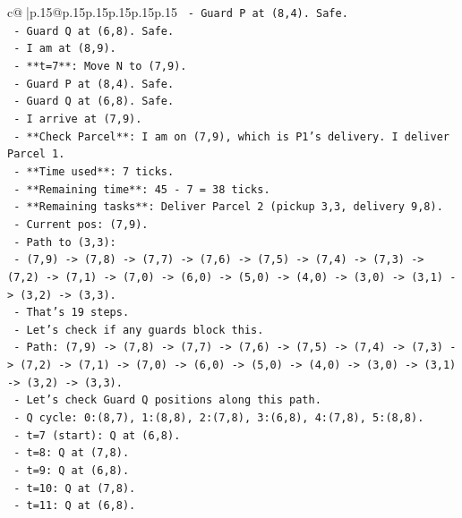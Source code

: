 \documentclass{article}
\begin{document}
{\begin{supertabular}{c@{$\;$}|p{.15\linewidth}@{}p{.15\linewidth}p{.15\linewidth}p{.15\linewidth}p{.15\linewidth}p{.15\linewidth}}
{{{\texttt{        {-}   Guard P at (8,4). Safe.} \\
\texttt{        {-}   Guard Q at (6,8). Safe.} \\
\texttt{        {-}   I am at (8,9).} \\
\texttt{    {-}   **t=7**: Move N to (7,9).} \\
\texttt{        {-}   Guard P at (8,4). Safe.} \\
\texttt{        {-}   Guard Q at (6,8). Safe.} \\
\texttt{        {-}   I arrive at (7,9).} \\
\texttt{        {-}   **Check Parcel**: I am on (7,9), which is P1's delivery. I deliver Parcel 1.} \\
\texttt{        {-}   **Time used**: 7 ticks.} \\
\texttt{        {-}   **Remaining time**: 45 {-} 7 = 38 ticks.} \\
\texttt{        {-}   **Remaining tasks**: Deliver Parcel 2 (pickup 3,3, delivery 9,8).} \\
\texttt{        {-}   Current pos: (7,9).} \\
\texttt{        {-}   Path to (3,3):} \\
\texttt{            {-}   (7,9) {-}> (7,8) {-}> (7,7) {-}> (7,6) {-}> (7,5) {-}> (7,4) {-}> (7,3) {-}> (7,2) {-}> (7,1) {-}> (7,0) {-}> (6,0) {-}> (5,0) {-}> (4,0) {-}> (3,0) {-}> (3,1) {-}> (3,2) {-}> (3,3).} \\
\texttt{            {-}   That's 19 steps.} \\
\texttt{            {-}   Let's check if any guards block this.} \\
\texttt{            {-}   Path: (7,9) {-}> (7,8) {-}> (7,7) {-}> (7,6) {-}> (7,5) {-}> (7,4) {-}> (7,3) {-}> (7,2) {-}> (7,1) {-}> (7,0) {-}> (6,0) {-}> (5,0) {-}> (4,0) {-}> (3,0) {-}> (3,1) {-}> (3,2) {-}> (3,3).} \\
\texttt{            {-}   Let's check Guard Q positions along this path.} \\
\texttt{            {-}   Q cycle: 0:(8,7), 1:(8,8), 2:(7,8), 3:(6,8), 4:(7,8), 5:(8,8).} \\
\texttt{            {-}   t=7 (start): Q at (6,8).} \\
\texttt{            {-}   t=8: Q at (7,8).} \\
\texttt{            {-}   t=9: Q at (6,8).} \\
\texttt{            {-}   t=10: Q at (7,8).} \\
\texttt{            {-}   t=11: Q at (6,8).} \\
}}}
\end{supertabular}}
\end{document}
